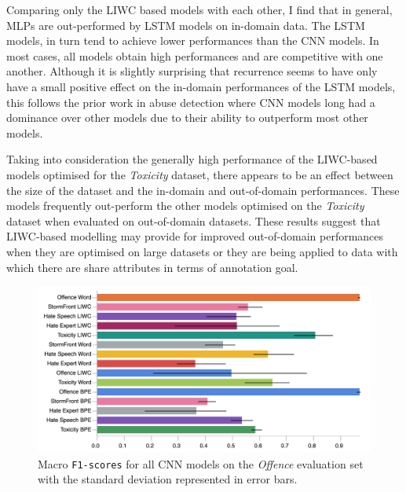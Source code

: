 Comparing only the LIWC based models with each other, I find that in general, MLPs are out-performed by LSTM models on in-domain data.
The LSTM models, in turn tend to achieve lower performances than the CNN models.
In most cases, all models obtain high performances and are competitive with one another.
Although it is slightly surprising that recurrence seems to have only have a small positive effect on the in-domain performances of the LSTM models, this follows the prior work in abuse detection where CNN models long had a dominance over other models due to their ability to outperform most other models.

Taking into consideration the generally high performance of the LIWC-based models optimised for the \textit{Toxicity} dataset, there appears to be an effect between the size of the dataset and the in-domain and out-of-domain performances.
These models frequently out-perform the other models optimised on the \textit{Toxicity} dataset when evaluated on out-of-domain datasets.
These results suggest that LIWC-based modelling may provide for improved out-of-domain performances when they are optimised on large datasets or they are being applied to data with which there are share attributes in terms of annotation goal.

\begin{figure}
\centering
    \includegraphics[width=\textwidth]{all_cnn_davidson_test.pdf}
    \caption{Macro \texttt{F1-scores} for all CNN models on the \textit{Offence} evaluation set with the standard deviation represented in error bars.}
    \label{fig:davidson_cnn_test}
\end{figure}

